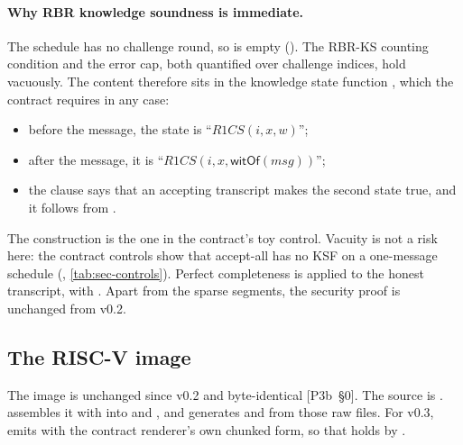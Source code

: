 \paragraph{Why RBR knowledge soundness is immediate.} The schedule has no challenge round, so
 is empty (). The RBR-KS counting condition and the error
cap, both quantified over challenge indices, hold vacuously. The content therefore sits in the
knowledge state function , which the contract requires in any case:
\begin{itemize}[nosep]
\item before the message, the state is ``$R1CS(i,x,w)$'';
\item after the message, it is ``$R1CS(i,x,\mathsf{witOf}(\mathit{msg}))$'';
\item the  clause says that an accepting transcript makes the second state true, and it
  follows from .
\end{itemize}
The construction is the one in the contract's toy control. Vacuity is not a risk here: the contract
controls show that accept-all has no KSF on a one-message schedule (,
\cref{tab:sec-controls}). Perfect completeness is  applied to the honest
transcript, with . Apart from the sparse segments, the security proof is unchanged
from v0.2.

\subsection{The RISC-V image}\label{subsec:base-image}

The image is unchanged since v0.2 and byte-identical [P3b~§0]. The source is .
 assembles it with  into
 and , and generates  and  from
those raw files. For v0.3,  emits  with the contract
renderer's own chunked form, so that  holds by .

